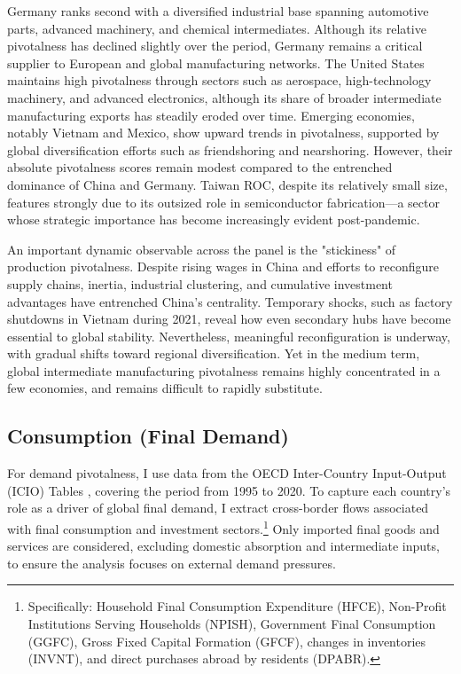 \documentclass[11pt]{article}
\begin{document}
Germany ranks second with a diversified industrial base spanning automotive parts, advanced machinery, and chemical intermediates. Although its relative pivotalness has declined slightly over the period, Germany remains a critical supplier to European and global manufacturing networks. The United States maintains high pivotalness through sectors such as aerospace, high-technology machinery, and advanced electronics, although its share of broader intermediate manufacturing exports has steadily eroded over time. Emerging economies, notably Vietnam and Mexico, show upward trends in pivotalness, supported by global diversification efforts such as friendshoring and nearshoring. However, their absolute pivotalness scores remain modest compared to the entrenched dominance of China and Germany. Taiwan ROC, despite its relatively small size, features strongly due to its outsized role in semiconductor fabrication—a sector whose strategic importance has become increasingly evident post-pandemic.

An important dynamic observable across the panel is the "stickiness" of production pivotalness. Despite rising wages in China and efforts to reconfigure supply chains, inertia, industrial clustering, and cumulative investment advantages have entrenched China’s centrality. Temporary shocks, such as factory shutdowns in Vietnam during 2021, reveal how even secondary hubs have become essential to global stability. Nevertheless, meaningful reconfiguration is underway, with gradual shifts toward regional diversification. Yet in the medium term, global intermediate manufacturing pivotalness remains highly concentrated in a few economies, and remains difficult to rapidly substitute.

\subsection{Consumption (Final Demand)}

For demand pivotalness, I use data from the OECD Inter-Country Input-Output (ICIO) Tables \citep{oecdicio2023}, covering the period from 1995 to 2020. To capture each country’s role as a driver of global final demand, I extract cross-border flows associated with final consumption and investment sectors.\footnote{Specifically: Household Final Consumption Expenditure (HFCE), Non-Profit Institutions Serving Households (NPISH), Government Final Consumption (GGFC), Gross Fixed Capital Formation (GFCF), changes in inventories (INVNT), and direct purchases abroad by residents (DPABR).} Only imported final goods and services are considered, excluding domestic absorption and intermediate inputs, to ensure the analysis focuses on external demand pressures.
\end{document}
